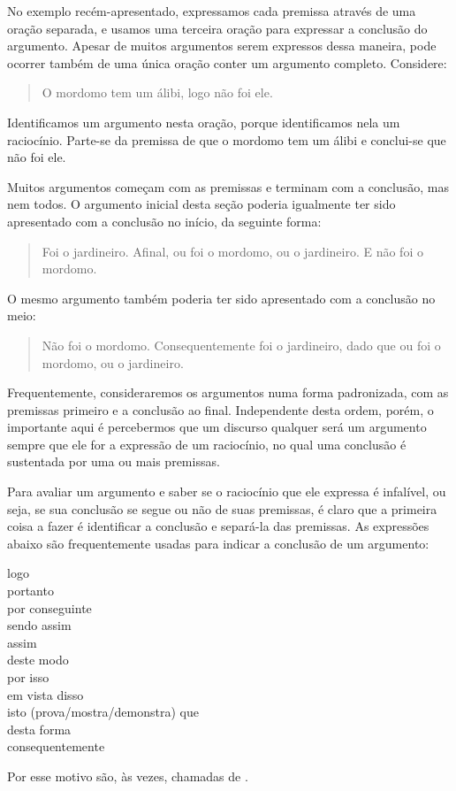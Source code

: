 No exemplo recém-apresentado, expressamos cada premissa através de uma oração separada, e usamos uma terceira oração para  expressar a conclusão do argumento.
Apesar de muitos argumentos serem expressos dessa maneira, pode ocorrer também de uma única oração conter um argumento completo. 
Considere:
	\begin{quote}
		O mordomo tem um álibi, logo não foi ele.
	\end{quote}
Identificamos um argumento nesta oração, porque identificamos nela um raciocínio. Parte-se da premissa de que o mordomo tem um álibi e conclui-se que não foi ele.

Muitos argumentos começam com as premissas e terminam com a conclusão, mas nem todos.
O argumento inicial desta seção poderia igualmente ter sido apresentado com a conclusão no início, da seguinte forma:
	\begin{quote}
		Foi o jardineiro. Afinal, ou foi o mordomo, ou o jardineiro. E não foi o mordomo.
	\end{quote}
O mesmo argumento também poderia ter sido apresentado com a conclusão no meio:
	\begin{quote}
		Não foi o mordomo. Consequentemente foi o jardineiro, dado que ou foi o mordomo, ou o jardineiro.
	\end{quote}
Frequentemente, consideraremos os argumentos numa forma padronizada, com as premissas primeiro e a conclusão ao final.
Independente desta ordem, porém, o importante aqui é percebermos que um discurso qualquer será um argumento sempre que ele for a expressão de um raciocínio, no qual uma conclusão é sustentada por uma ou mais premissas. 

Para avaliar um argumento e saber se o raciocínio que ele expressa é infalível, ou seja, se sua conclusão se segue ou não de suas premissas, é claro que a primeira coisa a fazer é identificar a conclusão e separá-la das premissas.
As expressões abaixo são frequentemente usadas para indicar a conclusão de um argumento:
	\begin{center}
		logo\\ portanto\\ por conseguinte\\ sendo assim\\ assim\\ deste modo\\ por isso\\ em vista disso\\ isto (prova/mostra/demonstra) que\\ desta forma\\ consequentemente
	\end{center}
Por esse motivo são, às vezes, chamadas de .

